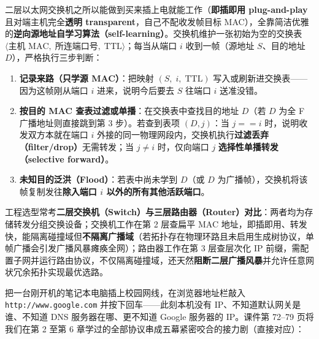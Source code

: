 二层以太网交换机之所以能做到买来插上电就能工作（\textbf{即插即用 plug-and-play} 且对端主机完全\textbf{透明 transparent}，自己不配收发帧目标 MAC），全靠简洁优雅的\textbf{逆向源地址自学习算法（self-learning）}。交换机维护一张初始为空的交换表 $\langle \text{主机 MAC},\; \text{所连端口号},\; \mathrm{TTL}\rangle$；每当从端口 $i$ 收到一帧（源地址 $S$、目的地址 $D$），严格执行三步判断：
\begin{enumerate}
\item \textbf{记录来路（只学源 MAC）}：把映射 $(S,\; i,\; \mathrm{TTL})$ 写入或刷新进交换表——因为这帧刚从端口 $i$ 进来，说明今后要去 $S$ 往端口 $i$ 送准没错。
\item \textbf{按目的 MAC 查表过滤或单播}：在交换表中查找目的地址 $D$（若 $D$ 为全 F 广播地址则直接跳到第 3 步）。若查到表项 $(D, j)$：当 $j == i$ 时，说明收发双方本就在端口 $i$ 外接的同一物理网段内，交换机执行\textbf{过滤丢弃（filter/drop）}无需转发；当 $j \neq i$ 时，仅向端口 $j$ \textbf{选择性单播转发（selective forward）}。
\item \textbf{未知目的泛洪（Flood）}：若表中尚未学到 $D$（或 $D$ 为广播帧），交换机将该帧复制发往\textbf{除入端口 $i$ 以外的所有其他活跃端口}。
\end{enumerate}

工程选型常考\textbf{二层交换机（Switch）与三层路由器（Router）对比}：两者均为存储转发分组交换设备；交换机工作在第 2 层查扁平 MAC 地址，即插即用、转发快，能隔离碰撞域但\textbf{不隔离广播域}（若拓扑存在物理环路且未启用生成树协议，单帧广播会引发广播风暴瘫痪全网）；路由器工作在第 3 层查层次化 IP 前缀，需配置子网并运行路由协议，不仅隔离碰撞域，还天然\textbf{阻断二层广播风暴}并允许任意网状冗余拓扑实现最优选路。



把一台刚开机的笔记本电脑插上校园网线，在浏览器地址栏敲入 \texttt{http://www.google.com} 并按下回车——此刻本机没有 IP、不知道默认网关是谁、不知道 DNS 服务器在哪、更不知道 Google 服务器的 IP。课件第 72–79 页将我们在第 2 至第 6 章学过的全部协议串成五幕紧密咬合的接力剧（直接对应）：


